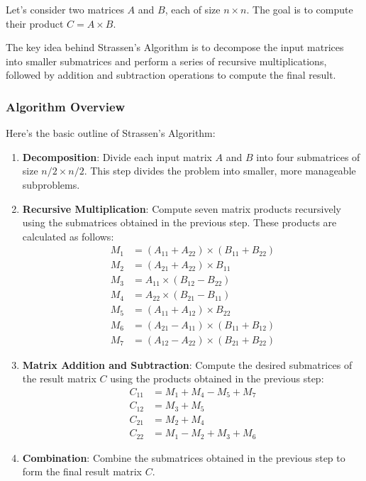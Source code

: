 \documentclass[12pt]{book} %
\begin{document}
Let's consider two matrices $A$ and $B$, each of size $n \times n$. The goal is to compute their product $C = A \times B$.

The key idea behind Strassen's Algorithm is to decompose the input matrices into smaller submatrices and perform a series of recursive multiplications, followed by addition and subtraction operations to compute the final result.

\subsubsection{Algorithm Overview}
Here's the basic outline of Strassen's Algorithm:

\begin{enumerate}
    \item \textbf{Decomposition}: Divide each input matrix $A$ and $B$ into four submatrices of size $n/2 \times n/2$. This step divides the problem into smaller, more manageable subproblems.
    
    \item \textbf{Recursive Multiplication}: Compute seven matrix products recursively using the submatrices obtained in the previous step. These products are calculated as follows:
    \begin{align*}
        M_1 &= (A_{11} + A_{22}) \times (B_{11} + B_{22}) \\
        M_2 &= (A_{21} + A_{22}) \times B_{11} \\
        M_3 &= A_{11} \times (B_{12} - B_{22}) \\
        M_4 &= A_{22} \times (B_{21} - B_{11}) \\
        M_5 &= (A_{11} + A_{12}) \times B_{22} \\
        M_6 &= (A_{21} - A_{11}) \times (B_{11} + B_{12}) \\
        M_7 &= (A_{12} - A_{22}) \times (B_{21} + B_{22})
    \end{align*}
    
    \item \textbf{Matrix Addition and Subtraction}: Compute the desired submatrices of the result matrix $C$ using the products obtained in the previous step:
    \begin{align*}
        C_{11} &= M_1 + M_4 - M_5 + M_7 \\
        C_{12} &= M_3 + M_5 \\
        C_{21} &= M_2 + M_4 \\
        C_{22} &= M_1 - M_2 + M_3 + M_6
    \end{align*}
    
    \item \textbf{Combination}: Combine the submatrices obtained in the previous step to form the final result matrix $C$.
\end{enumerate}
\end{document}
